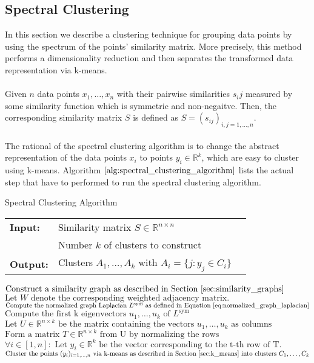 \subsection{Spectral Clustering}
\label{sec:spectral_clustering_bg}
In this section we describe a clustering technique for grouping data points by using the spectrum of the points' similarity matrix. More precisely, this method performs a dimensionality reduction and then separates the transformed data representation via k-means. \\ \\
Given $n$ data points $x_1, \dots, x_n$ with their pairwise similarities $s_ij$ measured by some similarity function which is symmetric and non-negaitve. Then, the corresponding similarity matrix $S$ is defined as $S = (s_{ij})_{i,j=1,\dots,n}$. \\ \\
The rational of the spectral clustering algorithm is to change the abstract representation of the data points $x_i$ to points $y_i \in \mathbb{R}^k$, which are easy to cluster using k-means. Algorithm $\ref{alg:spectral_clustering_algorithm}$ lists the actual step that have to performed to run the spectral clustering algorithm.
\begin{algorithm}[H]
\caption{Spectral Clustering Algorithm}
\begin{table}[H]
  \begin{tabular}{@{}lll@{}}
    \textbf{Input:} & Similarity matrix $S \in \mathbb{R}^{n \times n}$ \\
		& Number $k$ of clusters to construct \\
    \textbf{Output:} & Clusters $A_1, \dots, A_k$ with $A_i = \{ j : y_j \in C_i\}$ \\
  \end{tabular} 
\end{table}
\setlength{\fboxrule}{0pt} 
\begin{boxedminipage}{1.0\textwidth}
  \begin{algorithmic}[1]
  	  \State $\text{Construct a similarity graph as described in Section }\ref{sec:similarity_graphs}$
  	  \State $\text{Let } W \text{ denote the corresponding weighted adjacency matrix}.$
  	  \State $\text{Compute the normalized graph Laplacian } L^{\text{sym}} \text{ as defined in Equation } \ref{eq:normalized_graph_laplacian}$
  	  \State $\text{Compute the first k eigenvectors } u_1,\dots,u_k \text{ of } L^{\text{sym}}$
  	  \State $\text{Let } U \in \mathbb{R}^{n \times k} \text{ be the matrix containing the vectors } u_1,\dots,u_k \text{ as columns}$
  	  \State $\text{Form a matrix } T \in \mathbb{R}^{n \times k} \text{ from U by normalizing the rows}$
  	  \State $\forall i \in \left[ 1, n \right]: \text{ Let } y_i \in \mathbb{R}^k \text{ be the vector corresponding to the t-th row of T.}$
  	  \State $\text{Cluster the points } (y_i)_{i=1,\dots,n} \text{ via k-means as described in Section } \ref{sec:k_means} \text{ into clusters } C_1, \dots, C_k$
  \end{algorithmic}
  \end{boxedminipage}
  \vskip1.5pt
\label{alg:spectral_clustering_algorithm}
\end{algorithm}

